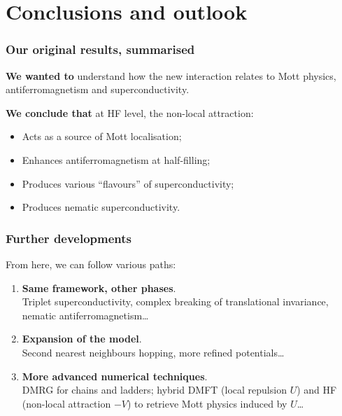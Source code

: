 \section{Conclusions and outlook}

\begin{frame}
	\frametitle{Our original results, summarised}
	
	\textbf{We wanted to} understand how the new interaction relates to Mott physics, antiferromagnetism and superconductivity.
	\vspace{1em}
	
	\textbf{We conclude that} at HF level, the non-local attraction:
	\begin{itemize}
		\item Acts as a source of Mott localisation;
		\item Enhances antiferromagnetism at half-filling;
		\item Produces various ``flavours'' of superconductivity;
		\item Produces nematic superconductivity.
	\end{itemize}
	
\end{frame}

\begin{frame}
	\frametitle{Further developments}
	
	From here, we can follow various paths:
	\begin{enumerate}
		\item \textbf{Same framework, other phases}.\\
		Triplet superconductivity, complex breaking of translational invariance, nematic antiferromagnetism\dots
		\item \textbf{Expansion of the model}.\\
		Second nearest neighbours hopping, more refined potentials\dots
		\item \textbf{More advanced numerical techniques}.\\
		DMRG for chains and ladders; hybrid DMFT (local repulsion $U$) and HF (non-local attraction $-V$) to retrieve Mott physics induced by $U$\dots
	\end{enumerate}
\end{frame}